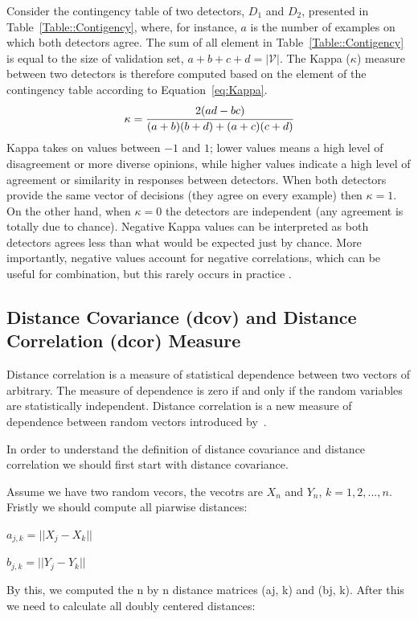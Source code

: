 Consider the contingency table of two detectors, $D_1$ and $D_2$, presented in Table~\ref{Table::Contigency}, where, for instance, $a$ is the number of examples on which both detectors agree.
The sum of all element in Table~\ref{Table::Contigency} is equal to the size of validation set, $a+b+c+d=|\mathcal{V}|$.
The Kappa ($\kappa$) measure between two detectors is therefore computed based on the element of the contingency table according to Equation~\ref{eq:Kappa}.
\begin{equation}
  \kappa =  \cfrac{2(ad-bc)}{(a+b)(b+d) + (a+c)(c+d) }
  \label{eq:Kappa}
\end{equation}
Kappa takes on values between $-1$ and $1$; lower values means a high level of disagreement or more diverse opinions, while higher values indicate a high level of agreement or similarity in responses between detectors.
When both detectors provide the same vector of decisions (they agree on every example) then $\kappa=1$.
On the other hand, when $\kappa=0$ the detectors are independent (any agreement is totally due to chance).
Negative Kappa values can be interpreted as both detectors agrees less than what would be expected just by chance.
More importantly, negative values account for negative correlations, which can be useful for combination, but this rarely occurs in practice \cite{Margineantu1997}.  %


\subsection{Distance Covariance (dcov) and Distance Correlation  (dcor) Measure}
\label{sec:dcov-dcor}
Distance correlation is a measure of statistical dependence between two vectors of arbitrary. The measure of dependence is zero if and only if the random variables are statistically independent. Distance correlation is a new measure of dependence between random vectors introduced by~\cite{Szekely2009}.

In order to understand the definition of distance covariance and distance correlation we should first start with distance covariance.

Assume we have two random vecors, the vecotrs are $X_n$ and $Y_n$, $k=1,2,...,n$. Fristly we should compute all piarwise distances:

$a_{j,k} = ||X_j - X_k||$

$b_{j,k} = ||Y_j - Y_k||$

By this, we computed the n by n distance matrices (aj, k) and (bj, k). After this we need to calculate all doubly centered distances:

